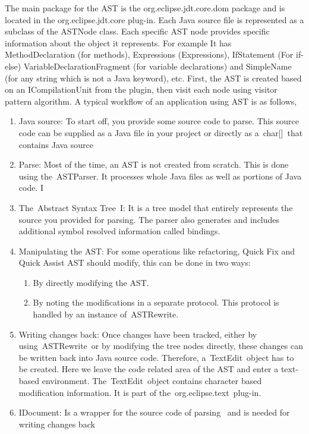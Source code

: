  The main package for the AST is the org.eclipse.jdt.core.dom package and is located in the org.eclipse.jdt.core plug-in. Each Java source file is represented as a subclass of the ASTNode class. Each specific AST node provides specific information about the object it represents. For example It has MethodDeclaration (for methods), Expressions (Expressions), IfStatement (For if-else) VariableDeclarationFragment (for variable declarations) and SimpleName (for any string which is not a Java keyword), etc. First, the  AST is created based on an ICompilationUnit from the plugin, then visit each node using visitor pattern algorithm. A typical workflow of an application using AST is as follows,
 \begin{enumerate}
 	
 \item Java source: To start off, you provide some source code to parse. This source code can be supplied as a Java file in your project or directly as a char[] that contains Java source
 \item Parse: Most of the time, an AST is not created from scratch. This is done using the ASTParser. It processes whole Java files as well as portions of Java code. I 
 
\item The Abstract Syntax Tree I: It is a tree model that entirely represents the source you provided for parsing. The parser also generates and includes additional symbol resolved information called bindings.
\item  Manipulating the AST: For some operations like refactoring, Quick Fix and Quick Assist AST should modify, this can be done in two ways:
 \begin{enumerate}
 	\item By directly modifying the AST.
    \item By noting the modifications in a separate protocol. This protocol is handled by an instance of ASTRewrite.
\end{enumerate}
\item Writing changes back: Once changes have been tracked, either by using ASTRewrite or by modifying the tree nodes directly, these changes can be written back into Java source code. Therefore, a TextEdit object has to be created. Here we leave the code related area of the AST and enter a text-based environment. The TextEdit object contains character based modification information. It is part of the org.eclipse.text plug-in.
 
\item IDocument: Is a wrapper for the source code of parsing  and is needed for writing changes back
 
\end{enumerate}
 
